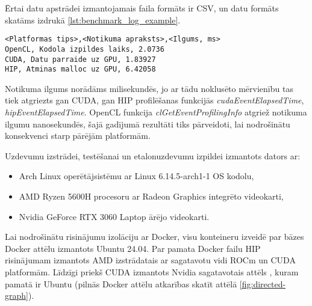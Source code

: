 Ērtai datu apstrādei izmantojamais faila formāts ir CSV, un datu formāts
skatāms izdrukā \ref{lst:benchmark_log_example}.
\begin{lstlisting}[caption={Etalonuzdevuma žurnālfaila ieraksta formāts},
  label=lst:benchmark_log_example,
  captionpos=b
]
<Platformas tips>,<Notikuma apraksts>,<Ilgums, ms>
OpenCL, Kodola izpildes laiks, 2.0736
CUDA, Datu parraide uz GPU, 1.83927
HIP, Atminas malloc uz GPU, 6.42058
\end{lstlisting}

Notikuma ilgums norādāms milisekundēs, jo ar tādu noklusēto mērvienību tas tiek
atgriezts gan CUDA, gan HIP profilēšanas funkcijās
\textit{cudaEventElapsedTime}, \textit{hipEventElapsedTime}. OpenCL funkcija
\textit{clGetEventProfilingInfo} atgriež notikuma ilgumu nanosekundēs, šajā
gadījumā rezultāti tiks pārveidoti, lai nodrošinātu konsekvenci starp pārējām
platformām.

Uzdevumu izstrādei, testēšanai un etalonuzdevumu izpildei izmantots dators ar:
\begin{itemize}
    \item Arch Linux operētājsistēmu ar Linux 6.14.5-arch1-1 OS kodolu,
    \item AMD Ryzen 5600H procesoru ar Radeon Graphics integrēto videokarti,
    \item Nvidia GeForce RTX 3060 Laptop ārējo videokarti.
\end{itemize}

Lai nodrošinātu risinājumu izolāciju ar Docker, visu konteineru izveidē par
bāzes Docker attēlu izmantots Ubuntu 24.04. Par pamata Docker failu HIP
risinājumam izmantots AMD izstrādatais \cite{amd_dockerfile} ar sagatavotu vidi
ROCm un CUDA platformām. Līdzīgi priekš CUDA izmantots Nvidia
sagatavotais attēls \cite{nvidia_dockerfile}, kuram pamatā ir Ubuntu (pilnās
Docker attēlu atkarības skatīt attēlā \ref{fig:directed-graph}).

